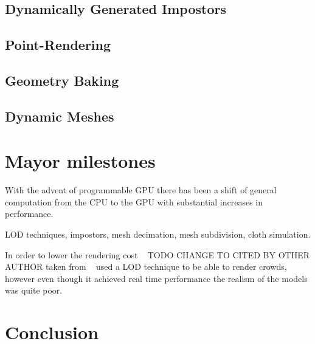 \documentclass[11pt,twocolumn]{article}
\numberwithin{equation}{section} %
\numberwithin{figure}{section} %
\numberwithin{table}{section} %
\begin{document}
\subsection{Dynamically Generated Impostors}
\subsection{Point-Rendering}
\subsection{Geometry Baking}
\subsection{Dynamic Meshes}

\section{Mayor milestones}

With the advent of programmable GPU there has been a shift of general computation from the CPU to the GPU with substantial increases in performance.

LOD techniques, impostors, mesh decimation, mesh subdivision, cloth simulation.

In order to lower the rendering cost ~\cite{pratt1997humans} TODO CHANGE TO CITED BY OTHER AUTHOR taken from ~\cite{Aubel1999} used a LOD technique to be able to render crowds, however even though it  achieved real time performance the realism of the models was quite poor.



\section{Conclusion}

%


\end{document}
